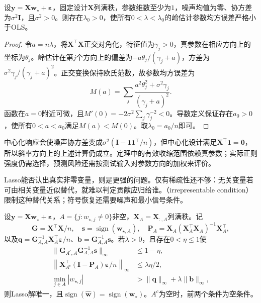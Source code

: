 \begin{theorem}[小幅岭收缩的参数均方误差]
  \label{thm:regression-ridge-mse}
  设$\bm{y}=\bm{X}\bm{w}_{\star}+\bm{\varepsilon}$，固定设计$\bm{X}$列满秩，参数维数至少为$1$，噪声均值为零、协方差为$\sigma^2\bm{I}$，且$\sigma^2>0$。则存在$\lambda_0>0$，使所有$0<\lambda<\lambda_0$的岭估计参数均方误差严格小于OLS。
\end{theorem}

\begin{proof}
令$a=n\lambda$，将$\bm{X}^{\top}\bm{X}$正交对角化，特征值为$\gamma_j>0$，真参数在相应方向上的坐标为$\theta_j$。岭估计在第$j$个方向上的偏差为$-a\theta_j/(\gamma_j+a)$，方差为$\sigma^2\gamma_j/(\gamma_j+a)^2$。正交变换保持欧氏范数，故参数均方误差为
\[
  M(a)=\sum_j\frac{a^2\theta_j^2+\sigma^2\gamma_j}{(\gamma_j+a)^2}.
\]
函数在$a=0$附近可微，且$M'(0)=-2\sigma^2\sum_j\gamma_j^{-2}<0$。导数定义保证存在$a_0>0$，使所有$0<a<a_0$满足$M(a)<M(0)$。取$\lambda_0=a_0/n$即可。
\end{proof}

中心化响应会使噪声协方差变成$\sigma^2(\bm{I}-\bm{1}\bm{1}^{\top}/n)$，但中心化设计满足$\bm{X}^{\top}\bm{1}=\bm{0}$，所以斜率方向上的上述计算仍成立。定理中的有效收缩范围依赖真参数；实际正则强度仍需选择，预测风险还需按测试输入对参数方向的加权来评价。

Lasso能否认出真实非零变量，则是更强的问题。仅有稀疏性还不够：无关变量若可由相关变量近似替代，就难以判定贡献应归给谁。（irrepresentable condition）限制这种替代关系；符号恢复还需要噪声和最小信号条件。

\begin{theorem}[Lasso的确定性符号恢复充分条件]
  \label{thm:regression-lasso-recovery}
  设$\bm{y}=\bm{X}\bm{w}_{\star}+\bm{\varepsilon}$，$A=\{j:w_{\star,j}\ne0\}$非空，$\bm{X}_A=\bm{X}_{:,A}$列满秩。记
  \[
    \bm{G}=\bm{X}^{\top}\bm{X}/n,\quad
    \bm{s}=\operatorname{sign}(\bm{w}_{\star,A}),\quad
    \bm{P}_A=\bm{X}_A(\bm{X}_A^{\top}\bm{X}_A)^{-1}\bm{X}_A^{\top},
  \]
  以及$\bm{q}=\bm{G}_{A,A}^{-1}\bm{X}_A^{\top}\bm{\varepsilon}/n$、$\bm{b}=\bm{G}_{A,A}^{-1}\bm{s}$。若$\lambda>0$，且存在$0<\eta\leq1$使
  \begin{align}
    \lVert\bm{G}_{A^c,A}\bm{G}_{A,A}^{-1}\bm{s}\rVert_\infty
      &\leq1-\eta, \label{eq:regression-irrepresentable}\\
    \left\lVert\bm{X}_{A^c}^{\top}(\bm{I}-\bm{P}_A)
                  \bm{\varepsilon}/n\right\rVert_\infty
      &\leq\lambda\eta/2, \label{eq:regression-lasso-noise}\\
    \min_{j\in A}|w_{\star,j}|
      &>\lVert\bm{q}\rVert_\infty+\lambda\lVert\bm{b}\rVert_\infty,
      \label{eq:regression-lasso-beta-min}
  \end{align}
  则Lasso解唯一，且$\operatorname{sign}(\widehat{\bm{w}})=\operatorname{sign}(\bm{w}_{\star})$。$A^c$为空时，前两个条件为空条件。
\end{theorem}

